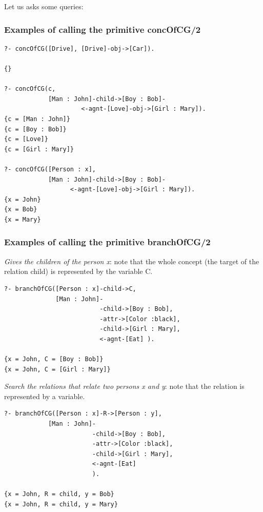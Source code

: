 \documentclass{book}
\begin{document}
Let us asks some queries:

\subsubsection{Examples of calling the primitive concOfCG/2}

\begin{verbatim}
?- concOfCG([Drive], [Drive]-obj->[Car]).

{}

?- concOfCG(c, 
            [Man : John]-child->[Boy : Bob]-
                     <-agnt-[Love]-obj->[Girl : Mary]).
{c = [Man : John]}
{c = [Boy : Bob]}
{c = [Love]}
{c = [Girl : Mary]}

?- concOfCG([Person : x], 
            [Man : John]-child->[Boy : Bob]-
                  <-agnt-[Love]-obj->[Girl : Mary]).
{x = John}
{x = Bob}
{x = Mary}
\end{verbatim}


\subsubsection{Examples of calling the primitive branchOfCG/2}

{\it Gives the children of the person x}: note that the whole concept
(the target of the relation child) is represented by the variable C.


\begin{verbatim}
?- branchOfCG([Person : x]-child->C, 
              [Man : John]-
                          -child->[Boy : Bob],
                          -attr->[Color :black],
                          -child->[Girl : Mary],
                          <-agnt-[Eat] ).

{x = John, C = [Boy : Bob]}
{x = John, C = [Girl : Mary]}
\end{verbatim}


{\it Search the relations that relate two persons x and y}: note that
the relation is represented by a variable.


\begin{verbatim}
?- branchOfCG([Person : x]-R->[Person : y], 
            [Man : John]-
                        -child->[Boy : Bob],
                        -attr->[Color :black],
                        -child->[Girl : Mary],
                        <-agnt-[Eat]
                        ).

{x = John, R = child, y = Bob}
{x = John, R = child, y = Mary}
\end{verbatim}
\end{document}

